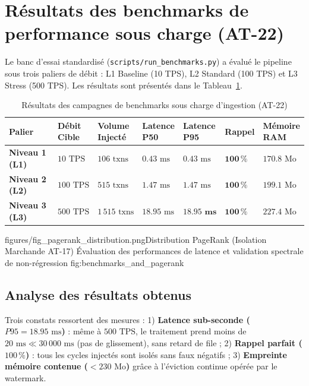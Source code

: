 \section{Résultats des benchmarks de performance sous charge (AT-22)}

Le banc d'essai standardisé (\texttt{scripts/run\_benchmarks.py}) a évalué le pipeline sous trois paliers de débit : L1 Baseline (10 TPS), L2 Standard (100 TPS) et L3 Stress (500 TPS). Les résultats sont présentés dans le Tableau~\ref{tab:benchmarks}.

\begin{table}[htbp]
\centering
\caption{Résultats des campagnes de benchmarks sous charge d'ingestion (AT-22)}
\label{tab:benchmarks}
\vspace{4pt}
\scriptsize
\setlength{\tabcolsep}{4pt}
\renewcommand{\arraystretch}{1.08}
\begin{tabularx}{\textwidth}{l *{6}{>{\centering\arraybackslash}X}}
\toprule
\textbf{Palier} & \makecell{\textbf{Débit}\\\textbf{Cible}} & \makecell{\textbf{Volume}\\\textbf{Injecté}} & \makecell{\textbf{Latence}\\\textbf{P50}} & \makecell{\textbf{Latence}\\\textbf{P95}} & \textbf{Rappel} & \makecell{\textbf{Mémoire}\\\textbf{RAM}} \\
\midrule
\textbf{Niveau 1 (L1)} & $10\text{ TPS}$ & $106\text{ txns}$ & $0.43\text{ ms}$ & $0.43\text{ ms}$ & $\mathbf{100\,\%}$ & $170.8\text{ Mo}$ \\
\textbf{Niveau 2 (L2)} & $100\text{ TPS}$ & $515\text{ txns}$ & $1.47\text{ ms}$ & $1.47\text{ ms}$ & $\mathbf{100\,\%}$ & $199.1\text{ Mo}$ \\
\textbf{Niveau 3 (L3)} & $500\text{ TPS}$ & $1\,515\text{ txns}$ & $18.95\text{ ms}$ & $\mathbf{18.95\text{ ms}}$ & $\mathbf{100\,\%}$ & $227.4\text{ Mo}$ \\
\bottomrule
\end{tabularx}
\end{table}

%
{figures/fig_pagerank_distribution.png}{Distribution PageRank (Isolation Marchande AT-17)}%
{Évaluation des performances de latence et validation spectrale de non-régression}%
{fig:benchmarks_and_pagerank}

\subsection{Analyse des résultats obtenus}

Trois constats ressortent des mesures : 1) \textbf{Latence sub-seconde ($P95 = 18.95\text{ ms}$)} : même à $500\text{ TPS}$, le traitement prend moins de $20\text{ ms} \ll 30\,000\text{ ms}$ (pas de glissement), sans retard de file ; 2) \textbf{Rappel parfait ($100\,\%$)} : tous les cycles injectés sont isolés sans faux négatifs ; 3) \textbf{Empreinte mémoire contenue ($< 230\text{ Mo}$)} grâce à l'éviction continue opérée par le watermark.

\newpage
